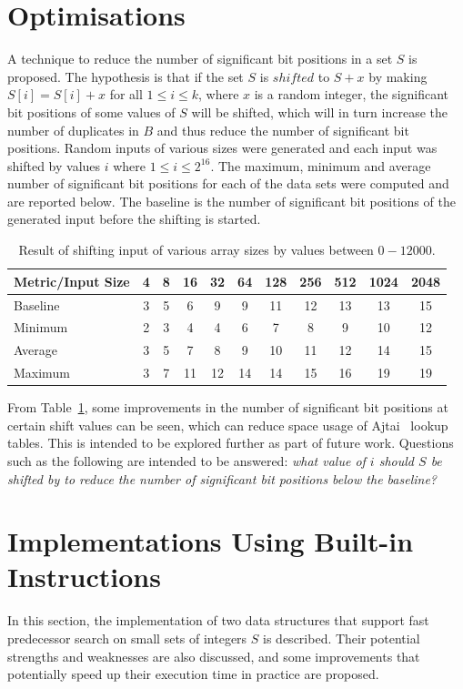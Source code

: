 \section{Optimisations} A technique to reduce the number of significant bit positions in a set $S$ is proposed. The hypothesis is that if the set $S$ is $shifted$ to $S+x$ by making $S[i] = S[i] + x$ for all $1 \leq i \leq k$, where $x$ is a random integer, the significant bit positions of some values of $S$ will be shifted, which will in turn increase the number of duplicates in $B$ and thus reduce the number of significant bit positions. Random inputs of various sizes were generated and each input was shifted by values $i$ where $1 \leq i \leq 2^{16}$. The maximum, minimum and average number of significant bit positions for each of the data sets were computed and are reported below. The baseline is the number of significant bit positions of the generated input before the shifting is started.\par
\begin{table}[H]
\centering
\begin{tabular}{|l|c|c|c|c|c|c|c|c|c|c|}
\hline
\textbf{Metric/Input Size} & \textbf{4} & \textbf{8} & \textbf{16} & \textbf{32} & \textbf{64} & \textbf{128} & \textbf{256} & \textbf{512} & \textbf{1024} & \textbf{2048} \\ \hline
Baseline  & 3  & 5  & 6  & 9  & 9  & 11 & 12 & 13 & 13 & 15 \\ \hline
Minimum       & 2  & 3  & 4  & 4  & 6  & 7  & 8  & 9  & 10 & 12 \\ \hline
Average   & 3  & 5  & 7  & 8  & 9  & 10 & 11 & 12 & 14 & 15 \\ \hline
Maximum       & 3  & 7  & 11 & 12 & 14 & 14 & 15 & 16 & 19 & 19 \\ \hline
\end{tabular}
\caption{Result of shifting input of various array sizes by values between $0 - 12000$.}
\label{table:reducingnbb}
\end{table}
\par
From Table~\ref{table:reducingnbb}, some improvements in the number of significant bit positions at certain shift values can be seen, which can reduce space usage of Ajtai~\cite{AJTAI1984217} lookup tables. This is intended to be explored further as part of future work. Questions such as the following are intended to be answered: \textit{what value of $i$ should $S$ be shifted by to reduce the number of significant bit positions below the baseline?}
\FloatBarrier
\section{Implementations Using Built-in Instructions} \label{experiments}
In this section, the implementation of two data structures that support fast predecessor search on small sets of integers $S$ is described. Their potential strengths and weaknesses are also discussed, and some improvements that potentially speed up their execution time in practice are proposed.\par
